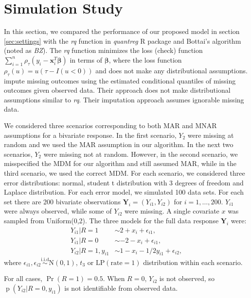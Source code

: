 \documentclass[12pt]{article}
\newcommand{\iid}{\stackrel{\text{i.i.d}}{\sim}}
\DeclareMathOperator{\pr}{p}
\DeclareMathOperator{\prob}{Pr}
\begin{document}
\section{Simulation Study}
\label{sec:simulation}
In this section, we compared the performance of our proposed model in
section \ref{sec:settings} with the \textit{rq} function in
\textit{quantreg} R package \citep{quantreg} and Bottai's algorithm
\citep{bottai2013} (noted as \textit{BZ}). The \textit{rq} function
minimizes the loss (check) function $\sum_{i=1}^n \rho_{\tau} (y_i -
\bm x_i^T \bm \beta)$ in terms of $\bm \beta$, where the loss function
$\rho_{\tau} (u) = u(\tau - I(u < 0))$ and does not make any
distributional assumptions. \citet{bottai2013} impute missing outcomes
using the estimated conditional quantiles of missing outcomes given
observed data. Their approach does not make distributional assumptions
similar to \textit{rq}.  Their imputation approach assumes ignorable
missing data.

We considered three scenarios corresponding to both MAR and MNAR
assumptions for a bivariate response.  In the first scenario, $Y_2$
were missing at random and we used the MAR assumption in our
algorithm. In the next two scenarios, $Y_2$ were missing not at
random. However, in the second scenario, we misspecified the MDM for
our algorithm and still assumed MAR, while in the third scenario, we
used the correct MDM.  For each scenario, we considered three error
distributions: normal, student t distribution with 3 degrees of
freedom and Laplace distribution. For each error model, we simulated
100 data sets. For each set there are 200 bivariate observations $\bm
Y_i = (Y_{i1}, Y_{i2})$ for $i = 1, \ldots, 200$. $Y_{i1}$ were always
observed, while some of $Y_{i2}$ were missing. A single covariate $x$
was sampled from Uniform(0,2). The three models for the full data
response $\bm Y_i$ were:
\begin{align*}
  Y_{i1} | R = 1 & \sim 2 + x_i +  \epsilon_{i1} , \\
  Y_{i1}| R = 0 & \sim  -2 - x_i +  \epsilon_{i1} , \\
  Y_{i2}| R = 1, y_{i1}&\sim 1 - x_i - 1/2y_{i1} + \epsilon_{i2},
\end{align*}
where $\epsilon_{i1}, \epsilon_{i2} \iid \textrm{N}(0, 1)$, $t_3$ or
$\text{LP}(\text{rate} = 1)$ distribution within each scenario.

For all cases, $\prob (R = 1) = 0.5$.  When $R = 0$, $Y_{i2}$ is not
observed, so $\pr(Y_{i2}| R = 0, y_{i1})$ is not identifiable from
observed data.
\end{document}
